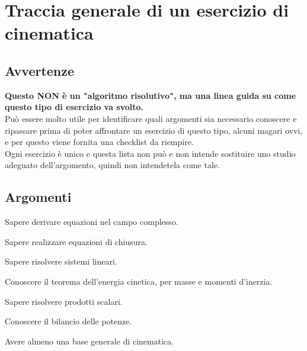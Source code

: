\documentclass[main.tex]{subfiles}
\begin{document}
\section{Traccia generale di un esercizio di cinematica}

\subsection{Avvertenze}
\textbf{Questo NON è un "algoritmo risolutivo", ma una linea guida su come questo tipo di esercizio va svolto.}
\\
Può essere molto utile per identificare quali argomenti sia necessario conoscere e ripassare prima di poter affrontare un esercizio di questo tipo, alcuni magari ovvi, e per questo viene fornita una checklist da riempire.
\\
Ogni esercizio è unico e questa lista non può e non intende sostituire uno studio adeguato dell'argomento, quindi non intendetela come tale.

\subsection{Argomenti}
\begin{todolist}
\item Sapere derivare equazioni nel campo complesso.
\item Sapere realizzare equazioni di chiusura.
\item Sapere risolvere sistemi lineari.
\item Conoscere il teorema dell'energia cinetica, per masse e momenti d'inerzia.
\item Sapere risolvere prodotti scalari.
\item Conoscere il bilancio delle potenze.
\item Avere almeno una base generale di cinematica.
\end{todolist}
\end{document}
